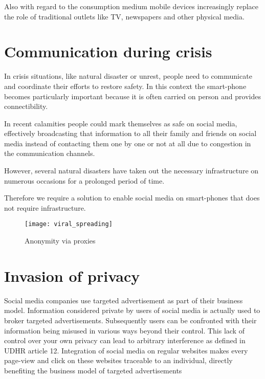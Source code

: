 Also with regard to the consumption medium mobile devices increasingly replace the role of traditional outlets like TV, newspapers and other physical media.


\section{Communication during crisis}
In crisis situations, like natural disaster or unrest, people need to communicate and coordinate their efforts to restore safety.
In this context the smart-phone becomes particularly important because it is often carried on person and provides connectibility.

In recent calamities people could mark themselves as safe on social media, effectively broadcasting that information to all their family and friends on social media instead of contacting them one by one or not at all due to congestion in the communication channels.

However, several natural disasters have taken out the necessary infrastructure on numerous occasions for a prolonged period of time. %

Therefore we require a solution to enable social media on smart-phones that does not require infrastructure. %


\begin{figure}
	\centering
	\texttt{[image: viral\_spreading]}
	\caption{Anonymity via proxies}
	\label{fig:viral_spreading}
\end{figure}


\section{Invasion of privacy}
Social media companies use targeted advertisement as part of their business model.
Information considered private by users of social media is actually used to broker targeted advertisements.
Subsequently users can be confronted with their information being misused in various ways beyond their control.
This lack of control over your own privacy can lead to arbitrary interference as defined in UDHR article 12. %
Integration of social media on regular websites makes every page-view and click on these websites traceable to an individual, directly benefiting the business model of targeted advertisements


